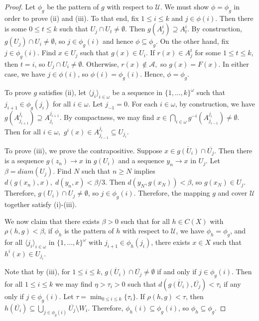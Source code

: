 \documentclass{amsart}
\numberwithin{equation}{section}
\begin{document}
\begin{proof}
Let $\phi_g$ be the pattern of $g$ with respect to $\mathcal{U}.$ We must show $\phi=\phi_g$ in order to prove (ii) and (iii). To that end, fix $1\leq i\leq k$ and $j\in \phi(i)$. Then there is some $0\leq t\leq k$ such that $U_j\cap U_t\neq \emptyset.$ Then $g(A_j^i)\supseteq A_t^i$. By construction, $g(U_j)\cap U_i \neq \emptyset$, so $j\in \phi_g(i)$ and hence $\phi\subseteq \phi_g$. On the other hand, fix $j\in \phi_g(i).$ Find $x\in U_j$ such that $g(x)\in U_i.$ If $r(x)\in A_j^t$ for some $1\leq t\leq k$, then $t=i$, so $U_j\cap U_i\neq \emptyset$. Otherwise, $r(x) \notin \mathcal{A},$ so $g(x)=F(x)$. In either case, we have $j\in \phi(i)$, so $\phi(i)=\phi_g(i).$ Hence, $\phi=\phi_g.$ 

To prove $g$ satisfies (ii), let $\langle j_i\rangle_{i\in \omega}$ be a sequence in $\{1,...,k\}^\omega$ such that $j_{i+1}\in \phi_g(j_i) $ for all $i\in \omega.$ Let $j_{-1}=0. $ For each $i\in \omega$, by construction, we have $g(A_{j_{i+1}}^{j_{i}})\supseteq A_{j_{i}}^{j_{i+1}}$. By compactness, we may find $x\in\displaystyle \bigcap_{i\in \omega} g^{-i}(A^{j_i}_{j_{i-1}})\neq \emptyset.$ Then for all $i\in \omega,$ $g^i(x) \in A^{j_i}_{j_{i-1}}\subseteq U_{j_i}.  $ 

To prove (iii), we prove the contrapositive. Suppose $x\in \overline{g(U_i)}\cap \overline{U_j}.$ Then there is a sequence $g(z_n)\to x$ in $g(U_i)$ and a sequence $y_n\to x$ in $U_j.$ Let $\beta= diam(U_j)$. Find $N$ such that $n\geq N$ implies $d(g(x_n),x),\; d(y_n,x)<\beta/3$. Then $d(y_N,g(x_N))<\beta$, so $g(x_N)\in U_j$. Therefore, $g(U_i)\cap U_j\neq \emptyset$, so $j\in \phi_g(i).$ Therefore, the mapping $g$ and cover $\mathcal{U}$ together satisfy (i)-(iii).



We now claim that there exists $\beta>0$ such that for all $h\in C(X)$ with $\rho(h,g)<\beta$, if $\phi_h$ is the pattern of $h$ with respect to $\mathcal{U}$, we have $\phi_h=\phi_g$, and for all $\langle j_i\rangle_{i\in \omega} $ in $\{1,...,k\}^\omega$ with $j_{i+1}\in \phi_h(j_i)$, there exists $x\in X$ such that $h^i(x)\in U_{j_i}$. 


Note that by (iii), for $1\leq i\leq k$, $\overline{g(U_i)}\cap \overline{U_j}\neq \emptyset$ if and only if $j\in \phi_g(i)$. Then for all $1\leq i\leq k$ we may find $\eta>\tau_i>0$ such that $d(\overline{g(U_i)},\overline{U_j})<\tau_i$ if any only if $j\in \phi_g(i).$ Let $\tau=\displaystyle\min_{0\leq i\leq k}\{\tau_i\}$. If $\rho(h,g)<\tau$, then $h(\overline{U_i})\subseteq \bigcup_{j\in \phi_g(i)}\overline{U_j}\setminus W_i.$ Therefore, $\phi_h(i)\subseteq \phi_g(i)$, so $\phi_h\subseteq \phi_g$. 


\end{proof}
\end{document}
